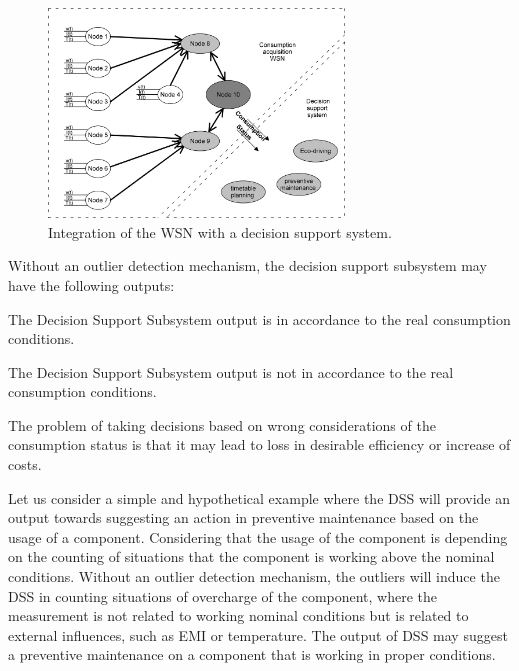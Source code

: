 \begin{figure}[h!]
	\centering
	\includegraphics[width=0.7\textwidth,keepaspectratio]{figures/36.Outlier/general}
	\caption{Integration of the \ac{WSN} with a decision support system. }
	\label{fig:general}
\end{figure}

Without an outlier detection mechanism, the decision support subsystem may have the following outputs:


\begin{description}
	\setlength\itemsep{-0.5em}
	\item[Input deviation from real value lower than a threshold]
	The Decision Support Subsystem output is in accordance to the real consumption conditions.
	\item[Input deviation from real value greater than a threshold]
	The Decision Support Subsystem output is not in accordance to the real consumption conditions.	
\end{description}

The problem of taking decisions based on wrong considerations of the consumption status is that it may lead to loss in desirable efficiency or increase of costs.

Let us consider a simple and hypothetical example where the \ac{DSS} will provide an output towards suggesting an action in preventive maintenance based on the usage of a component. Considering that the usage of the component is depending on the counting of situations that the component is working above the nominal conditions. Without an outlier detection mechanism, the outliers will induce the \ac{DSS} in counting situations of overcharge of the component, where the measurement is not related to working nominal conditions but is related to external influences, such as \ac{EMI} or temperature. The output of \ac{DSS} may suggest a preventive maintenance on a component that is working in proper conditions.

